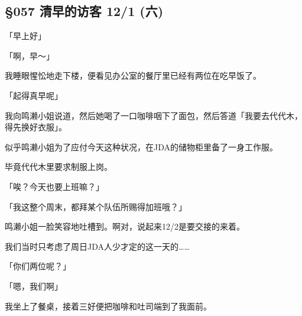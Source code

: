 \subsection{§057 清早的访客 12/1 (六)}

「早上好」

「啊，早～」

我睡眼惺忪地走下楼，便看见办公室的餐厅里已经有两位在吃早饭了。

「起得真早呢」

我向鸣濑小姐说道，然后她喝了一口咖啡咽下了面包，然后答道「我要去代代木，得先换好衣服」。

似乎鸣濑小姐为了应付今天这种状况，在JDA的储物柜里备了一身工作服。

毕竟代代木里要求制服上岗。

「唉？今天也要上班嘛？」

「我这整个周末，都拜某个队伍所赐得加班哦？」

鸣濑小姐一脸笑容地吐槽到。啊对，说起来12/2是要交接的来着。

我们当时只考虑了周日JDA人少才定的这一天的……

「你们两位呢？」

「嗯，我们啊」

我坐上了餐桌，接着三好便把咖啡和吐司端到了我面前。

